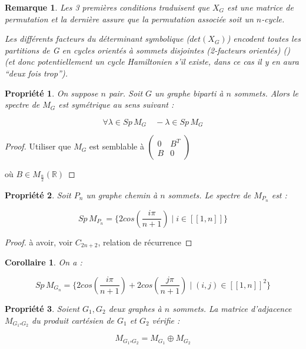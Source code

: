 \documentclass[french,a4paper]{article}
\newtheorem{property}{Propriété}[section]
\newtheorem{proof}{Preuve}[section]
\newtheorem{remark}{Remarque}[section]
\newtheorem{corollary}{Corollaire}[section]
\begin{document}
\begin{remark}
Les 3 premières conditions traduisent que $X_{G}$ est une matrice de permutation et la dernière assure que la permutation associée soit un $n$-cycle.


Les différents facteurs du déterminant symbolique ($det(X_{G})$) encodent toutes les partitions de G en cycles orientés à sommets disjointes (2-facteurs orientés) (\cite{Ejov2006SOLVINGTH}) (et donc potentiellement un cycle Hamiltonien s'il existe, dans ce cas il y en aura ``deux fois trop'').
\end{remark}

\begin{property}
On suppose $n$ pair. Soit $G$ un graphe biparti à $n$ sommets. Alors le spectre de $M_G$ est symétrique au sens suivant :

\[
\forall \lambda \in Sp \, M_G \quad -\lambda \in Sp \, M_G
\]
\end{property}

\begin{proof}
Utiliser que $M_G$ est semblable à 
$\begin{pmatrix}
0 & B^T \\
B & 0
\end{pmatrix}$

où $B \in M_{\frac{n}{2}}(\mathbb{R})$

\end{proof}

\begin{property}
Soit $P_n$ un graphe chemin à $n$ sommets. Le spectre de $M_{P_n}$ est :

\[
Sp \, M_{P_n}=\{2cos(\frac{i\pi}{n+1}) \mid i \in [\![1,n]\!]\}
\]
\end{property}

\begin{proof}
à avoir, voir $C_{2n+2}$, relation de récurrence
\end{proof}

\begin{corollary}
On a :

\[
Sp \, M_{G_n}=\{2cos(\frac{i\pi}{n+1})+2cos(\frac{j\pi}{n+1}) \mid (i,j) \in [\![1,n]\!]^2\}
\]
\end{corollary}

\begin{property}
Soient $G_1,G_2$ deux graphes à $n$ sommets. La matrice d'adjacence $M_{G_1 \square G_2}$ du produit cartésien de $G_1$ et $G_2$ vérifie :

\[
M_{G_1 \square G_2}=M_{G_1} \oplus M_{G_2}
\]
\end{property}
\end{document}
